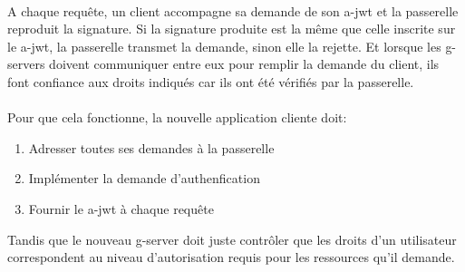 \paragraph{}
A chaque requête, un client accompagne sa demande de son \gls{a-jwt} et la passerelle reproduit la signature. Si la signature produite est la même que celle inscrite sur le \gls{a-jwt}, la passerelle transmet la demande, sinon elle la rejette. Et lorsque les \glspl{g-server} doivent communiquer entre eux pour remplir la demande du client, ils font confiance aux droits indiqués car ils ont été vérifiés par la passerelle.

\paragraph{}
Pour que cela fonctionne, la nouvelle application cliente doit:
\begin{enumerate}
    \item Adresser toutes ses demandes à la passerelle
    \item Implémenter la demande d'authenfication
    \item Fournir le \gls{a-jwt} à chaque requête
\end{enumerate}
Tandis que le nouveau \gls{g-server} doit juste contrôler que les droits d'un utilisateur correspondent au niveau d'autorisation requis pour les ressources qu'il demande.
